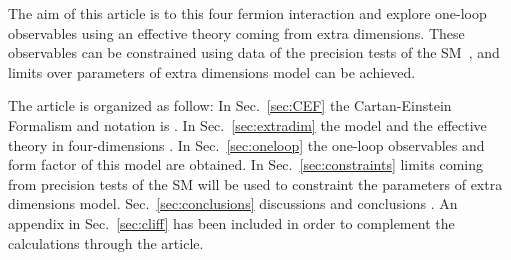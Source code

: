 The aim of  this article is to   this four fermion interaction and explore one-loop observables using an effective theory coming from extra dimensions. These observables can be constrained using data of the precision tests of the SM~\cite{Altarelli:2004fq,Beringer:1900zz}, and limits over parameters of extra dimensions model can be achieved. 

The article is organized as follow: In Sec.~\ref{sec:CEF}  the Cartan-Einstein Formalism  and notation is  . In Sec.~\ref{sec:extradim} the model  and the effective theory in four-dimensions  . In Sec.~\ref{sec:oneloop} the one-loop observables and form factor of this model are obtained. In Sec.~\ref{sec:constraints} limits coming from precision tests of the SM will be used to constraint the parameters of extra dimensions model.  Sec.~\ref{sec:conclusions} discussions and conclusions  . An appendix in Sec.~\ref{sec:cliff} has been included in order to complement the calculations through the article.
